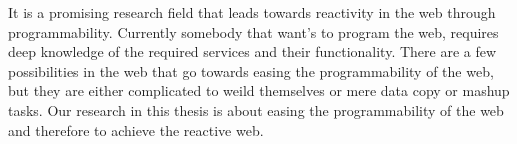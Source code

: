 


It is a promising research field that leads towards reactivity in the web through programmability.
Currently somebody that want's to program the web, requires deep knowledge of the required services and their functionality.
There are a few possibilities in the web that go towards easing the programmability of the web, but they are either complicated to weild themselves or mere data copy or mashup tasks.
Our research in this thesis is about easing the programmability of the web and therefore to achieve the reactive web. 

